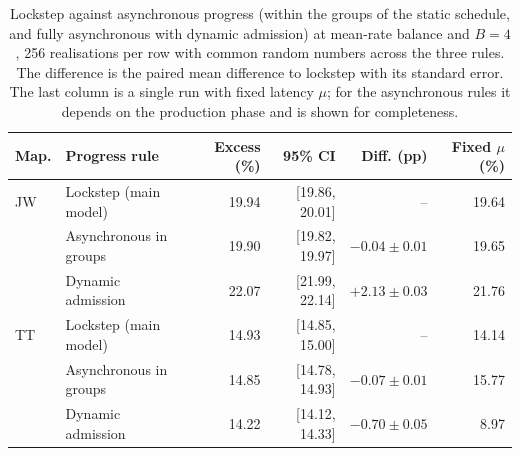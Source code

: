 \begin{table}[htbp]
\centering\small
\begin{tabular}{llrrrr}
\toprule
Map. & Progress rule & Excess (\%) & 95\% CI & Diff. (pp) & Fixed $\mu$ (\%)\\\midrule
JW & Lockstep (main model) & 19.94 & [19.86, 20.01] & -- & 19.64\\
 & Asynchronous in groups & 19.90 & [19.82, 19.97] & $-0.04\pm0.01$ & 19.65\\
 & Dynamic admission & 22.07 & [21.99, 22.14] & $+2.13\pm0.03$ & 21.76\\
TT & Lockstep (main model) & 14.93 & [14.85, 15.00] & -- & 14.14\\
 & Asynchronous in groups & 14.85 & [14.78, 14.93] & $-0.07\pm0.01$ & 15.77\\
 & Dynamic admission & 14.22 & [14.12, 14.33] & $-0.70\pm0.05$ & 8.97\\
\bottomrule
\end{tabular}
\caption{Lockstep against asynchronous progress (within the groups of the static schedule, and fully asynchronous with dynamic admission) at mean-rate balance and $B=4$, 256 realisations per row with common random numbers across the three rules. The difference is the paired mean difference to lockstep with its standard error. The last column is a single run with fixed latency $\mu$; for the asynchronous rules it depends on the production phase and is shown for completeness.}
\label{tab:async}
\end{table}
